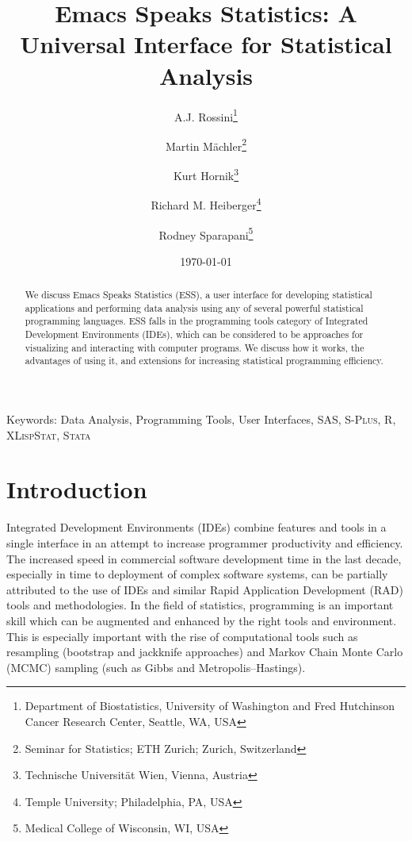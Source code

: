 \documentclass{article}
\title{Emacs Speaks Statistics: A Universal Interface for
  Statistical Analysis}
\author{A.J. Rossini\footnote{Department of Biostatistics, University
    of Washington and Fred Hutchinson Cancer Research Center, Seattle,
    WA, USA} \and Martin M{\"a}chler\footnote{Seminar for Statistics;
    ETH Zurich; Zurich, Switzerland} \and Kurt
  Hornik\footnote{Technische Universit{\"a}t Wien, Vienna, Austria}
  \and Richard M. Heiberger\footnote{Temple University; Philadelphia,
    PA, USA} \and Rodney Sparapani\footnote{Medical College of
    Wisconsin, WI, USA}}
\date{\today}
\newif\ifpdf
\newcommand*{\Splus}{\textsc{S-Plus}}
\newcommand*{\XLispStat}{\textsc{XLispStat}}
\newcommand*{\Stata}{\textsc{Stata}}
\begin{document}
\ifpdf
  \DeclareGraphicsExtensions{.jpg,.pdf,.png,.mps}
\fi


\singlespace

\maketitle

Keywords: Data Analysis, Programming Tools, User Interfaces, SAS,
\Splus, R, \XLispStat, \Stata

\begin{abstract}
  We discuss Emacs Speaks Statistics (ESS), a user interface for
  developing statistical applications and performing data analysis
  using any of several powerful statistical programming languages.
  ESS falls in the programming tools category of Integrated
  Development Environments (IDEs), which can be considered to be
  approaches for visualizing and interacting with computer programs.
  We discuss how it works, the advantages of using it, and extensions
  for increasing statistical programming efficiency.
\end{abstract}

\doublespace

\section{Introduction}
\label{sec:intro}

Integrated Development Environments (IDEs) combine features and tools
in a single interface in an attempt to increase programmer
productivity and efficiency.  The increased speed in commercial
software development time in the last decade, especially in time to
deployment of complex software systems, can be partially attributed to
the use of IDEs and similar Rapid Application Development (RAD) tools
and methodologies.  In the field of statistics, programming is an
important skill which can be augmented and enhanced by the right tools
and environment.  This is especially important with the rise of
computational tools such as resampling (bootstrap and jackknife
approaches) and Markov Chain Monte Carlo (MCMC) sampling (such as
Gibbs and Metropolis--Hastings).
\end{document}
